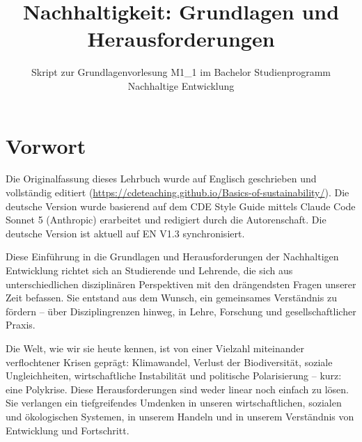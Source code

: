 \documentclass[
  nswissgerman,
  a4paper,
  DIV=11,
  numbers=noendperiod,
  oneside,
  openany]{scrreprt}
\title{Nachhaltigkeit: Grundlagen und Herausforderungen}
\subtitle{Skript zur Grundlagenvorlesung M1\_1 im Bachelor
Studienprogramm Nachhaltige Entwicklung}
\author{}
\date{}
\renewcommand{\maketitle}{}
\renewcommand*\contentsname{Inhaltsverzeichnis}
\newcommand\contentsname{Inhaltsverzeichnis}
\begin{document}
\maketitle



\renewcommand*\contentsname{Inhaltsverzeichnis}
{
\setcounter{tocdepth}{2}
\tableofcontents
}


\chapter*{Vorwort}\label{vorwort}


\begin{tcolorbox}[enhanced jigsaw, arc=.35mm, bottomrule=.15mm, bottomtitle=1mm, breakable, colback=white, colbacktitle=quarto-callout-note-color!10!white, colframe=quarto-callout-note-color-frame, coltitle=black, left=2mm, leftrule=.75mm, opacityback=0, opacitybacktitle=0.6, rightrule=.15mm, title={Disclaimer deutsche Übersetzung}, titlerule=0mm, toprule=.15mm, toptitle=1mm]

Die Originalfassung dieses Lehrbuch wurde auf Englisch geschrieben und
vollständig editiert
(\url{https://cdeteaching.github.io/Basics-of-sustainability/}). Die
deutsche Version wurde basierend auf dem CDE Style Guide mittels Claude
Code Sonnet 5 (Anthropic) erarbeitet und redigiert durch die
Autorenschaft. Die deutsche Version ist aktuell auf EN V1.3
synchronisiert.

\end{tcolorbox}

Diese Einführung in die Grundlagen und Herausforderungen der
Nachhaltigen Entwicklung richtet sich an Studierende und Lehrende, die
sich aus unterschiedlichen disziplinären Perspektiven mit den
drängendsten Fragen unserer Zeit befassen. Sie entstand aus dem Wunsch,
ein gemeinsames Verständnis zu fördern -- über Disziplingrenzen hinweg,
in Lehre, Forschung und gesellschaftlicher Praxis.

Die Welt, wie wir sie heute kennen, ist von einer Vielzahl miteinander
verflochtener Krisen geprägt: Klimawandel, Verlust der Biodiversität,
soziale Ungleichheiten, wirtschaftliche Instabilität und politische
Polarisierung -- kurz: eine Polykrise. Diese Herausforderungen sind
weder linear noch einfach zu lösen. Sie verlangen ein tiefgreifendes
Umdenken in unseren wirtschaftlichen, sozialen und ökologischen
Systemen, in unserem Handeln und in unserem Verständnis von Entwicklung
und Fortschritt.
\end{document}

